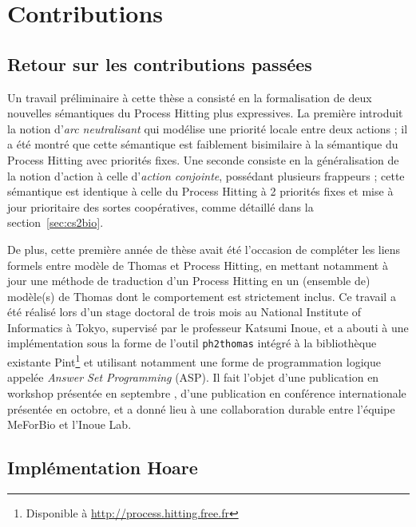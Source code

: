 \chapter{Contributions}

\section{Retour sur les contributions passées}\label{sec:retour}

Un travail préliminaire à cette thèse a consisté en la formalisation de deux nouvelles sémantiques du Process Hitting plus expressives.
La première introduit la notion d'\emph{arc neutralisant} qui modélise une priorité locale entre deux actions ;
il a été montré que cette sémantique est faiblement bisimilaire à la sémantique du Process Hitting avec priorités fixes.
Une seconde consiste en la généralisation de la notion d'action à celle d'\emph{action conjointe}, possédant plusieurs frappeurs ;
cette sémantique est identique à celle du Process Hitting à 2 priorités fixes et mise à jour prioritaire des sortes coopératives, comme détaillé dans la section~\ref{sec:cs2bio}.

De plus, cette première année de thèse avait été l'occasion de compléter les liens formels entre modèle de Thomas et Process Hitting,
en mettant notamment à jour une méthode de traduction d'un Process Hitting en un (ensemble de) modèle(s) de Thomas dont le comportement est strictement inclus.
Ce travail a été réalisé lors d'un stage doctoral de trois mois au National Institute of Informatics à Tokyo, supervisé par le professeur Katsumi Inoue, et a abouti à une implémentation sous la forme de l'outil \texttt{ph2thomas} intégré à la bibliothèque existante Pint\footnote{Disponible à \url{http://process.hitting.free.fr}} et utilisant notamment une forme de programmation logique appelée \emph{Answer Set Programming} (ASP).
Il fait l'objet d'une publication en workshop présentée en septembre \cite{FPIMR12-LDSSB}, d'une publication en conférence internationale \cite{FPIMR12-CMSB} présentée en octobre, et a donné lieu à une collaboration durable entre l'équipe MeForBio et l'Inoue Lab.

\section{Implémentation Hoare}

